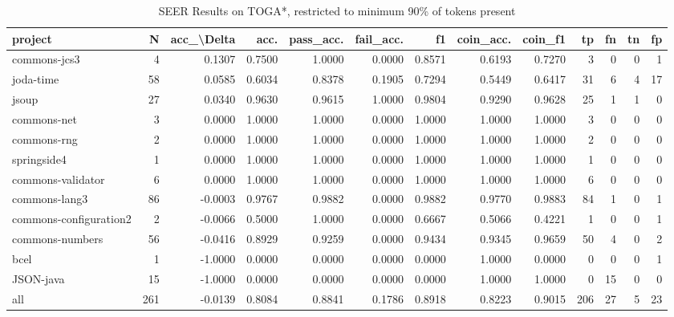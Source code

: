 \begin{table}
\centering
\caption{SEER Results on TOGA*, restricted to minimum 90\% of tokens present}
\label{tab:toga_results_10}
\begin{tabular}{lrrrrrrrrrrrr}
\toprule
                project &    N &  acc\_\textbackslash Delta &    acc. &  pass\_acc. &  fail\_acc. &      f1 &  coin\_acc. &  coin\_f1 &   tp &  fn &  tn &  fp \\
\midrule
           commons-jcs3 &    4 &      0.1307 &  0.7500 &     1.0000 &     0.0000 &  0.8571 &     0.6193 &   0.7270 &    3 &   0 &   0 &   1 \\
              joda-time &   58 &      0.0585 &  0.6034 &     0.8378 &     0.1905 &  0.7294 &     0.5449 &   0.6417 &   31 &   6 &   4 &  17 \\
                  jsoup &   27 &      0.0340 &  0.9630 &     0.9615 &     1.0000 &  0.9804 &     0.9290 &   0.9628 &   25 &   1 &   1 &   0 \\
            commons-net &    3 &      0.0000 &  1.0000 &     1.0000 &     0.0000 &  1.0000 &     1.0000 &   1.0000 &    3 &   0 &   0 &   0 \\
            commons-rng &    2 &      0.0000 &  1.0000 &     1.0000 &     0.0000 &  1.0000 &     1.0000 &   1.0000 &    2 &   0 &   0 &   0 \\
            springside4 &    1 &      0.0000 &  1.0000 &     1.0000 &     0.0000 &  1.0000 &     1.0000 &   1.0000 &    1 &   0 &   0 &   0 \\
      commons-validator &    6 &      0.0000 &  1.0000 &     1.0000 &     0.0000 &  1.0000 &     1.0000 &   1.0000 &    6 &   0 &   0 &   0 \\
          commons-lang3 &   86 &     -0.0003 &  0.9767 &     0.9882 &     0.0000 &  0.9882 &     0.9770 &   0.9883 &   84 &   1 &   0 &   1 \\
 commons-configuration2 &    2 &     -0.0066 &  0.5000 &     1.0000 &     0.0000 &  0.6667 &     0.5066 &   0.4221 &    1 &   0 &   0 &   1 \\
        commons-numbers &   56 &     -0.0416 &  0.8929 &     0.9259 &     0.0000 &  0.9434 &     0.9345 &   0.9659 &   50 &   4 &   0 &   2 \\
                   bcel &    1 &     -1.0000 &  0.0000 &     0.0000 &     0.0000 &  0.0000 &     1.0000 &   0.0000 &    0 &   0 &   0 &   1 \\
              JSON-java &   15 &     -1.0000 &  0.0000 &     0.0000 &     0.0000 &  0.0000 &     1.0000 &   1.0000 &    0 &  15 &   0 &   0 \\
                    all &  261 &     -0.0139 &  0.8084 &     0.8841 &     0.1786 &  0.8918 &     0.8223 &   0.9015 &  206 &  27 &   5 &  23 \\
\bottomrule
\end{tabular}
\end{table}

